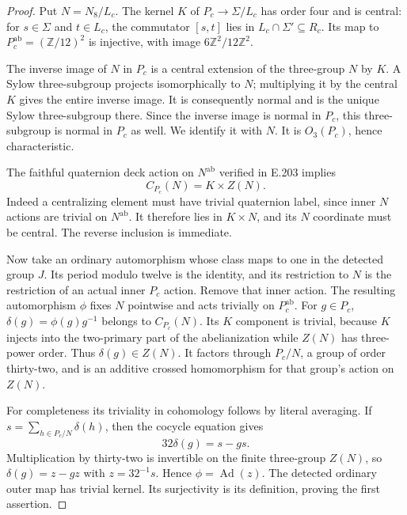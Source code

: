 \begin{proof}
Put $N=N_8/L_c$.  The kernel $K$ of
$P_c\to\Sigma/L_c$ has order four and is central: for
$s\in\Sigma$ and $t\in L_c$, the commutator $[s,t]$ lies
in $L_c\cap\Sigma'\subseteq R_c$.  Its map to
$P_c^{\mathrm{ab}}=(\mathbb Z/12)^2$ is injective, with
image $6\mathbb Z^2/12\mathbb Z^2$.

The inverse image of $N$ in $P_c$ is a central extension of
the three-group $N$ by $K$.  A Sylow three-subgroup projects
isomorphically to $N$; multiplying it by the central $K$
gives the entire inverse image.  It is consequently normal
and is the unique Sylow three-subgroup there.  Since the
inverse image is normal in $P_c$, this three-subgroup is
normal in $P_c$ as well.  We identify it with $N$.
It is $O_3(P_c)$, hence characteristic.

The faithful quaternion deck action on $N^{\mathrm{ab}}$
verified in E.203 implies
\[
                         C_{P_c}(N)=K\times Z(N).                \tag{E.204.3}
\]
Indeed a centralizing element must have trivial quaternion
label, since inner $N$ actions are trivial on
$N^{\mathrm{ab}}$.  It therefore lies in $K\times N$,
and its $N$ coordinate must be central.  The reverse
inclusion is immediate.

Now take an ordinary automorphism whose class maps to one
in the detected group $J$.  Its period modulo twelve is
the identity, and its restriction to $N$ is the
restriction of an actual inner $P_c$ action.  Remove
that inner action.  The resulting automorphism $\phi$
fixes $N$ pointwise and acts trivially on $P_c^{\mathrm{ab}}$.
For $g\in P_c$,
$\delta(g)=\phi(g)g^{-1}$ belongs to $C_{P_c}(N)$.
Its $K$ component is trivial, because $K$ injects into
the two-primary part of the abelianization while $Z(N)$
has three-power order.  Thus $\delta(g)\in Z(N)$.
It factors through $P_c/N$, a group of order thirty-two,
and is an additive crossed homomorphism for that group's
action on $Z(N)$.

For completeness its triviality in cohomology follows by
literal averaging.  If
$s=\sum_{h\in P_c/N}\delta(h)$, then the cocycle equation
gives
\[
          32\delta(g)=s-gs.
\]
Multiplication by thirty-two is invertible on the finite
three-group $Z(N)$, so $\delta(g)=z-gz$ with $z=32^{-1}s$.
Hence $\phi=\operatorname{Ad}(z)$.  The detected ordinary
outer map has trivial kernel.  Its surjectivity is its
definition, proving the first assertion.


\end{proof}
